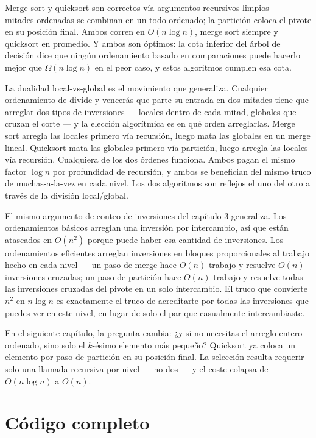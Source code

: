 \documentclass[11pt,a4paper]{article}
\begin{document}
Merge sort y quicksort son correctos vía argumentos recursivos limpios --- mitades ordenadas se combinan en un todo ordenado; la partición coloca el pivote en su posición final. Ambos corren en $O(n \log n)$, merge sort siempre y quicksort en promedio. Y ambos son óptimos: la cota inferior del árbol de decisión dice que ningún ordenamiento basado en comparaciones puede hacerlo mejor que $\Omega(n \log n)$ en el peor caso, y estos algoritmos cumplen esa cota.

La dualidad local-vs-global es el movimiento que generaliza. Cualquier ordenamiento de divide y vencerás que parte su entrada en dos mitades tiene que arreglar dos tipos de inversiones --- locales dentro de cada mitad, globales que cruzan el corte --- y la elección algorítmica es en qué orden arreglarlas. Merge sort arregla las locales primero vía recursión, luego mata las globales en un merge lineal. Quicksort mata las globales primero vía partición, luego arregla las locales vía recursión. Cualquiera de los dos órdenes funciona. Ambos pagan el mismo factor $\log n$ por profundidad de recursión, y ambos se benefician del mismo truco de muchas-a-la-vez en cada nivel. Los dos algoritmos son reflejos el uno del otro a través de la división local/global.

El mismo argumento de conteo de inversiones del capítulo 3 generaliza. Los ordenamientos básicos arreglan una inversión por intercambio, así que están atascados en $O(n^2)$ porque puede haber esa cantidad de inversiones. Los ordenamientos eficientes arreglan inversiones en bloques proporcionales al trabajo hecho en cada nivel --- un paso de merge hace $O(n)$ trabajo y resuelve $O(n)$ inversiones cruzadas; un paso de partición hace $O(n)$ trabajo y resuelve todas las inversiones cruzadas del pivote en un solo intercambio. El truco que convierte $n^2$ en $n \log n$ es exactamente el truco de acreditarte por todas las inversiones que puedes ver en este nivel, en lugar de solo el par que casualmente intercambiaste.

En el siguiente capítulo, la pregunta cambia: ¿y si no necesitas el arreglo entero ordenado, sino solo el $k$-ésimo elemento más pequeño? Quicksort ya coloca un elemento por paso de partición en su posición final. La selección resulta requerir solo una llamada recursiva por nivel --- no dos --- y el coste colapsa de $O(n \log n)$ a $O(n)$.

\section{Código completo}
\end{document}

